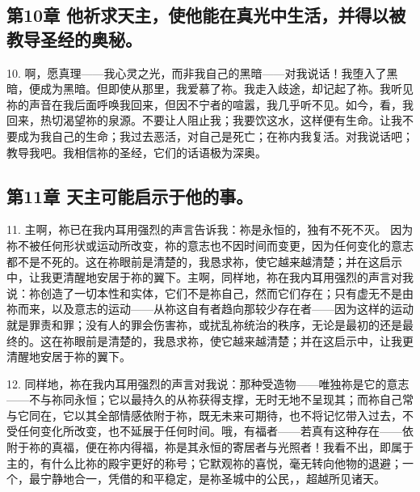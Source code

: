 
\subsection{第10章 他祈求天主，使他能在真光中生活，并得以被教导圣经的奥秘。}

10. 啊，愿真理——我心灵之光，而非我自己的黑暗——对我说话！我堕入了黑暗，便成为黑暗。但即使从那里，我爱慕了祢。我走入歧途，却记起了祢。我听见祢的声音在我后面呼唤我回来，但因不宁者的喧嚣，我几乎听不见。如今，看，我回来，热切渴望祢的泉源。不要让人阻止我；我要饮这水，这样便有生命。让我不要成为我自己的生命；我过去恶活，对自己是死亡；在祢内我复活。对我说话吧；教导我吧。我相信祢的圣经，它们的话语极为深奥。\par


\subsection{第11章 天主可能启示于他的事。}

11. 主啊，祢已在我内耳用强烈的声言告诉我：祢是永恒的，独有不死不灭。 因为祢不被任何形状或运动所改变，祢的意志也不因时间而变更，因为任何变化的意志都不是不死的。这在祢眼前是清楚的，我恳求祢，使它越来越清楚；并在这启示中，让我更清醒地安居于祢的翼下。主啊，同样地，祢在我内耳用强烈的声言对我说：祢创造了一切本性和实体，它们不是祢自己，然而它们存在；只有虚无不是由祢而来，以及意志的运动——从祢这自有者趋向那较少存在者——因为这样的运动就是罪责和罪；没有人的罪会伤害祢，或扰乱祢统治的秩序，无论是最初的还是最终的。这在祢眼前是清楚的，我恳求祢，使它越来越清楚；并在这启示中，让我更清醒地安居于祢的翼下。\par

12. 同样地，祢在我内耳用强烈的声言对我说：那种受造物——唯独祢是它的意志——不与祢同永恒；它以最持久的从祢获得支撑，无时无地不呈现其；而祢自己常与它同在，它以其全部情感依附于祢，既无未来可期待，也不将记忆带入过去，不受任何变化所改变，也不延展于任何时间。哦，有福者——若真有这种存在——依附于祢的真福，便在祢内得福，祢是其永恒的寄居者与光照者！我看不出，即属于主的，有什么比祢的殿宇更好的称号；它默观祢的喜悦，毫无转向他物的退避；一个，最宁静地合一，凭借的和平稳定，是祢圣城中的公民，，超越所见诸天。\par

